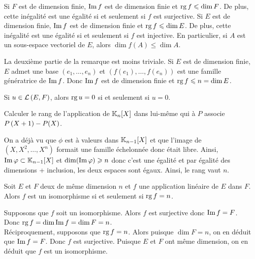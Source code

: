 \documentclass{magnolia}
\begin{document}
\begin{remarques}
\remarque[utile=-2] Si $F$ est de dimension finie, $\operatorname{Im} f$ est de dimension finie et
  $\operatorname{rg} f\leqslant \dim F$. De plus, cette inégalité est une égalité si et seulement
  si $f$ est surjective.
\remarque Si $E$ est de dimension finie, $\operatorname{Im} f$ est
  de dimension finie et $\operatorname{rg} f\leqslant \dim E$. De plus, cette inégalité est une
  égalité si et seulement si $f$ est injective. En particulier, si $A$ est un sous-espace
  vectoriel de $E$, alors $\dim f(A)\leq \dim A$.
  \begin{sol}
  La deuxième partie de la remarque est moins triviale. Si $E$ est de dimension finie, $E$ admet une base $(e_1,\ldots,e_n)$ et $(f(e_1),\ldots,f(e_n))$ est une famille génératrice de $\operatorname{Im} f$. Donc $\operatorname{Im} f$ est de dimension finie et $\operatorname{rg} f\leqslant n=\dim E$.
  \end{sol}
\remarque[utile=-3] Si $u\in\mathcal{L}\left(E,F\right)$, alors $\operatorname{rg} u=0$ si et seulement si $u=0$.
\end{remarques}

\begin{exoUnique}
\exo Calculer le rang de l'application de $\polyK[n]$ dans lui-même
  qui à $P$ associe $P\left(X+1\right)-P(X)$.

\end{exoUnique}

  \begin{sol}
  On a déjà vu que $\phi$ est à valeurs dans $\polyK[n-1]$ et que l'image de $(X,X^2,\ldots,X^n)$ formait une famille échelonnée donc était libre. Ainsi, $\im \phi\subset \polyK[n-1]$ et $\dim( \operatorname{Im} \varphi)\geqslant n$ donc c'est une égalité et par égalité des dimensions + inclusion, les deux espaces sont égaux. Ainsi, le rang vaut $n$.
  \end{sol}


\begin{proposition}[utile=2]
Soit $E$ et $F$ deux \Kevs de même dimension $n$ et $f$ une application
linéaire de $E$ dans $F$. Alors $f$ est un isomorphisme si et seulement si
$\operatorname{rg} f=n$.
\end{proposition}
\begin{preuve}
Supposons que $f$ soit un isomorphisme. Alors $f$ est surjective donc
$\operatorname{Im} f=F$. Donc $\operatorname{rg} f=\dim\operatorname{Im} f=\dim F=n$.\\
Réciproquement, supposons que $\operatorname{rg} f=n$. Alors puisque $\dim F=n$, on en
déduit que $\operatorname{Im} f=F$. Donc $f$ est surjective. Puisque $E$ et $F$ ont même
dimension, on en déduit que $f$ est un isomorphisme.
\end{preuve}
\end{document}
